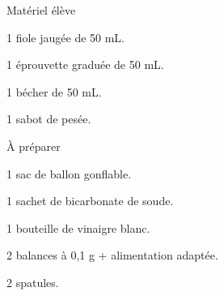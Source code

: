 
\begin{boiteMateriel}{Matériel élève}
  \effectifSeconde
  
  \begin{protocole}
    \item 1 fiole jaugée de 50 mL.
    \item 1 éprouvette graduée de 50 mL.
    \item 1 bécher de 50 mL.
    \item 1 sabot de pesée.
  \end{protocole}
\end{boiteMateriel}


\begin{boiteMateriel}{À préparer}
  \begin{protocole}
    \item 1 sac de ballon gonflable.
    \item 1 sachet de bicarbonate de soude.
    \item 1 bouteille de vinaigre blanc.
    \item 2 balances à 0,1 g + alimentation adaptée.
    \item 2 spatules.
  \end{protocole}
\end{boiteMateriel}